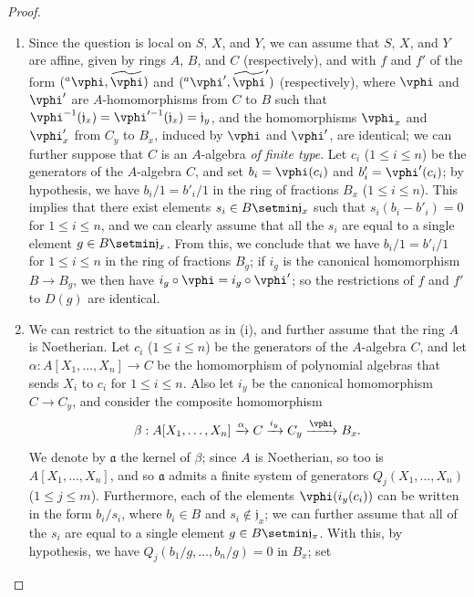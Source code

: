 \begin{proof}
\medskip\noindent
\begin{enumerate}
  \item[(i)] Since the question is local on $S$, $X$, and $Y$, we can assume that $S$, $X$, and $Y$ are affine, given by rings $A$, $B$, and $C$ (respectively), and with $f$ and $f'$ of the form $({}^a\vphi,\widetilde{\vphi})$ and $({}^a\vphi',\widetilde{\vphi}')$ (respectively), where $\vphi$ and $\vphi'$ are $A$-homomorphisms from $C$ to $B$ such that $\vphi^{-1}(\mathfrak{j}_x)=\vphi'^{-1}(\mathfrak{j}_x)=\mathfrak{j}_y$, and the homomorphisms $\vphi_x$ and $\vphi'_x$ from $C_y$ to $B_x$, induced by $\vphi$ and $\vphi'$, are identical;
    we can further suppose that $C$ is an $A$-algebra \emph{of finite type}.
    Let $c_i$ ($1\leq i\leq n$) be the generators of the $A$-algebra $C$, and set $b_i=\vphi(c_i)$ and $b'_i=\vphi'(c_i)$;
    by hypothesis, we have $b_i/1=b'_i/1$ in the ring of fractions $B_x$ ($1\leq i\leq n$).
    This implies that there exist elements $s_i\in B\setmin\mathfrak{j}_x$ such that $s_i(b_i-b'_i)=0$ for $1\leq i\leq n$, and we can clearly assume that all the $s_i$ are equal to a single element $g\in B\setmin\mathfrak{j}_x$.
    From this, we conclude that we have $b_i/1=b'_i/1$ for $1\leq i\leq n$ in the ring of fractions $B_g$;
    if $i_g$ is the canonical homomorphism $B\to B_g$, we then have $i_g\circ\vphi=i_g\circ\vphi'$;
    so the restrictions of $f$ and $f'$ to $D(g)$ are identical.
  \item[(ii)] We can restrict to the situation as in (i), and further assume that the ring $A$ is Noetherian.
    Let $c_i$ ($1\leq i\leq n$) be the generators of the $A$-algebra $C$, and let $\alpha:A[X_1,\ldots,X_n]\to C$ be the homomorphism of polynomial algebras that sends $X_i$ to $c_i$ for $1\leq i\leq n$.
    Also let $i_y$ be the canonical homomorphism $C\to C_y$, and consider the composite homomorphism
    \[
      \beta:A[X_1,\ldots,X_n] \xrightarrow{\alpha} C \xrightarrow{i_y} C_y \xrightarrow{\vphi} B_x.
    \]
    We denote by $\mathfrak{a}$ the kernel of $\beta$;
    since $A$ is Noetherian, so too is $A[X_1,\ldots,X_n]$, and so $\mathfrak{a}$ admits a finite system of generators $Q_j(X_1,\ldots,X_n)$ ($1\leq j\leq m$).
    Furthermore, each of the elements $\vphi(i_y(c_i))$ can be written in the form $b_i/s_i$, where $b_i\in B$ and $s_i\not\in\mathfrak{j}_x$;
    we can further assume that all of the $s_i$ are equal to a single element $g\in B\setmin\mathfrak{j}_x$.
    With this, by hypothesis, we have $Q_j(b_1/g,\ldots,b_n/g)=0$ in $B_x$; set

\end{enumerate}
\end{proof}
